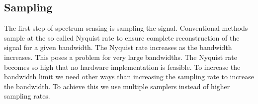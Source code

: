 \documentclass[a4paper, openany, oneside]{memoir}
\begin{document}
\subsection{Sampling}
The first step of spectrum sensing is sampling the signal. Conventional methods sample at the so called Nyquist rate  to ensure complete reconstruction of the signal for a given bandwidth. The Nyquist rate increases as the bandwidth increases. This poses a problem for very large bandwidths. The Nyquist rate becomes so high that no hardware implementation is feasible. To increase the bandwidth limit we need other ways than increasing the sampling rate to increase the bandwidth. To achieve this we use multiple samplers instead of higher sampling rates.
\end{document}
